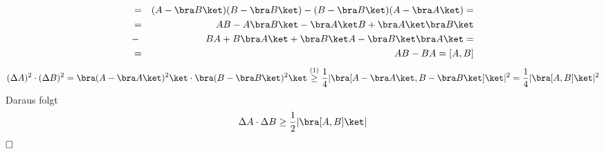 \begin{enumerate}
\begin{eqnarray*}
                [A - \bra A \ket, B - \bra B \ket] &=& (A - \bra B \ket)(B -
                \bra B \ket) - (B - \bra B \ket)(A - \bra A \ket) = \\
                &=& AB - A\bra B \ket - \bra A \ket B + \bra A \ket \bra B \ket
                \\&-& BA + B \bra A \ket + \bra B \ket A - \bra B \ket \bra A \ket = \\
                &=& AB - BA = [A, B]
        \end{eqnarray*}
        \begin{eqnarray*}
        (\Delta A)^2\cdot(\Delta B)^2= \bra (A - \bra A \ket)^2\ket \cdot \bra
        (B - \bra B \ket)^2\ket \overset{(1)}{\geq} \frac{1}{4} |\bra[A - \bra A \ket,
        B - \bra B \ket]\ket|^2 = \frac{1}{4} |\bra[A, B]\ket|^2
        \end{eqnarray*}
        Daraus folgt
        \[ \Delta A \cdot \Delta B \geq \frac{1}{2} |\bra[A,B]\ket| \]$\hfill\square$
\end{enumerate}

